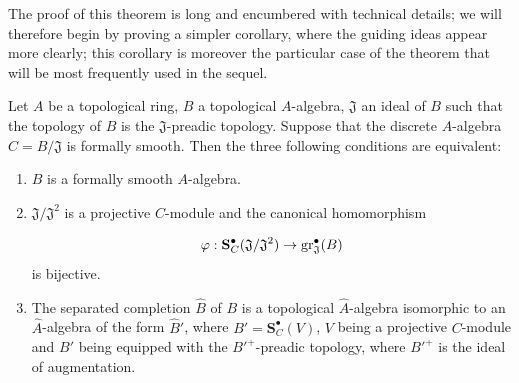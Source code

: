 The proof of this theorem is long and encumbered with technical details;
we will therefore begin by proving a simpler corollary, where the guiding ideas appear more clearly;
this corollary is moreover the particular case of the theorem  that will be most frequently used in the sequel.

\begin{corollary}[19.5.4]
\label{0.19.5.4}
Let $A$ be a topological ring, $B$ a topological $A$-algebra, $\mathfrak{J}$ an ideal of $B$ such that the topology of $B$ is the $\mathfrak{J}$-preadic topology.
Suppose that the discrete $A$-algebra $C=B/\mathfrak{J}$ is formally smooth.
Then the three following conditions are equivalent:
\begin{enumerate}
  \item[\textup{a)}] $B$ is a formally smooth $A$-algebra.
  \item[\textup{b)}] $\mathfrak{J}/\mathfrak{J}^2$ is a projective $C$-module and the canonical homomorphism
  
\[
\varphi:\mathbf{S}_C^\bullet(\mathfrak{J}/\mathfrak{J}^2) \to \operatorname{gr}_\mathfrak{J}^\bullet(B)
\]
  is bijective.
  \item[\textup{c)}] The separated completion $\widehat{B}$ of $B$ is a topological $\widehat{A}$-algebra isomorphic to an $\widehat{A}$-algebra of the form $\widehat{B}'$, where $B'=\mathbf{S}_C^\bullet(V)$, $V$ being a projective $C$-module and $B'$ being equipped with the ${B'}^+$-preadic topology, where ${B'}^+$ is the ideal of augmentation.
\end{enumerate}
\end{corollary}

